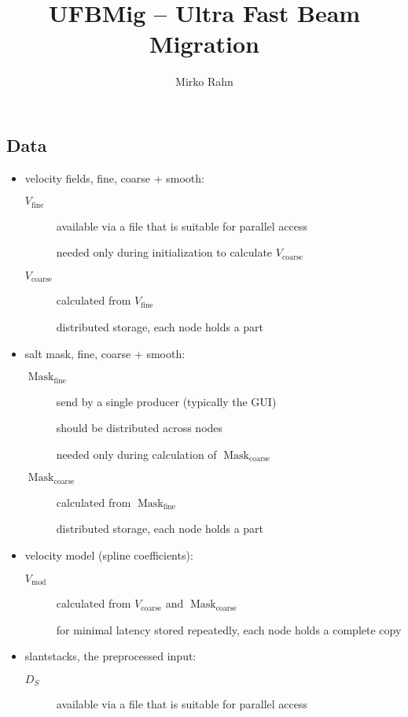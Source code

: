 \documentclass[12pt,a4paper]{article}
\DeclareMathOperator{\mask}{Mask}
\DeclareMathOperator{\fine}{fine}
\DeclareMathOperator{\coarse}{coarse}
\DeclareMathOperator{\vmod}{mod}
\newcommand{\fieldfine}{V_{\fine}}
\newcommand{\fieldcoarse}{V_{\coarse}}
\newcommand{\velmodel}{V_{\vmod}}
\newcommand{\maskfine}{\mask_{\fine}}
\newcommand{\maskcoarse}{\mask_{\coarse}}
\newcommand{\slantstacks}{D_S}
\begin{document}
\title{UFBMig -- Ultra Fast Beam Migration}

\author{Mirko Rahn}

\maketitle

\subsection*{Data}

\begin{itemize}
\item velocity fields, fine, coarse + smooth:
  \begin{description}
  \item[$\fieldfine$] available via a file that is suitable for parallel
    access

    needed only during initialization to calculate $\fieldcoarse$

  \item[$\fieldcoarse$] calculated from $\fieldfine$

    distributed storage, each node holds a part
  \end{description}

\item salt mask, fine, coarse + smooth:
  \begin{description}
  \item[$\maskfine$] send by a single producer (typically the GUI)

    should be distributed across nodes

    needed only during calculation of $\maskcoarse$

  \item[$\maskcoarse$] calculated from $\maskfine$

    distributed storage, each node holds a part
  \end{description}

\item velocity model (spline coefficients):
  \begin{description}
  \item[$\velmodel$] calculated from $\fieldcoarse$ and $\maskcoarse$

      for minimal latency stored repeatedly, each node holds a
      complete copy
  \end{description}

\item slantstacks, the preprocessed input:
  \begin{description}
  \item[$\slantstacks$] available via a file that is suitable for
    parallel access


\end{description}
\end{itemize}
\end{document}
